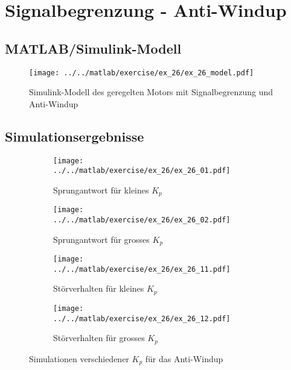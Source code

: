 \section{Signalbegrenzung - Anti-Windup}

\subsection{MATLAB/Simulink-Modell}

\begin{figure}[h!]
	\centering
	\texttt{[image: ../../matlab/exercise/ex\_26/ex\_26\_model.pdf]}
	\caption{Simulink-Modell des geregelten Motors mit Signalbegrenzung
		und Anti-Windup}
\end{figure}

\subsection{Simulationsergebnisse}
\begin{figure}[h!]
	\centering
	\begin{subfigure}{0.45\textwidth}
		\texttt{[image: ../../matlab/exercise/ex\_26/ex\_26\_01.pdf]}
		\caption{Sprungantwort für kleines $K_p$}
	\end{subfigure}
	\hfill{}
	\begin{subfigure}{0.45\textwidth}
		\texttt{[image: ../../matlab/exercise/ex\_26/ex\_26\_02.pdf]}
		\caption{Sprungantwort für grosses $K_p$}
	\end{subfigure}

	\begin{subfigure}{0.45\textwidth}
		\texttt{[image: ../../matlab/exercise/ex\_26/ex\_26\_11.pdf]}
		\caption{Störverhalten für kleines $K_p$}
	\end{subfigure}
	\hfill{}
	\begin{subfigure}{0.45\textwidth}
		\texttt{[image: ../../matlab/exercise/ex\_26/ex\_26\_12.pdf]}
		\caption{Störverhalten für grosses $K_p$}
	\end{subfigure}

	\caption{Simulationen verschiedener $K_p$ für das Anti-Windup}

\end{figure}
